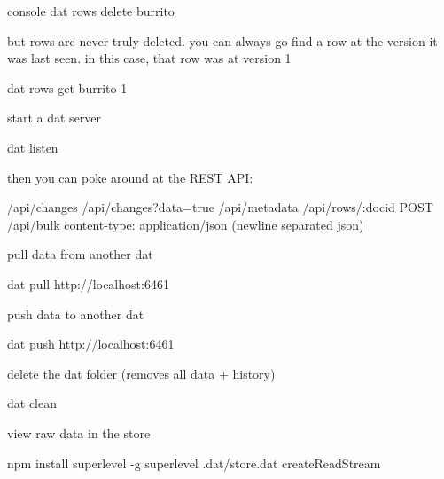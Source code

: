 \begin{src}{console}
    dat rows delete burrito

but rows are never truly deleted. you can always go find a row at the version it was last seen. in this case, that row was at version 1

    dat rows get burrito 1

start a dat server

    dat listen

then you can poke around at the REST API:

    /api/changes
    /api/changes?data=true
    /api/metadata
    /api/rows/:docid
    POST /api/bulk content-type: application/json (newline separated json)

pull data from another dat

    dat pull http://localhost:6461

push data to another dat

    dat push http://localhost:6461

delete the dat folder (removes all data + history)

    dat clean

view raw data in the store

    npm install superlevel -g
    superlevel .dat/store.dat createReadStream
\end{src}
